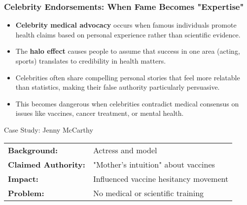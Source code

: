 \documentclass{beamer}
\begin{document}
	\begin{frame}
		\frametitle{Celebrity Endorsements: When Fame Becomes "Expertise"}
		\begin{itemize}
			\item \textbf{Celebrity medical advocacy} occurs when famous individuals promote health claims based on personal experience rather than scientific evidence.
			\item The \textbf{halo effect} causes people to assume that success in one area (acting, sports) translates to credibility in health matters.
			\item Celebrities often share compelling personal stories that feel more relatable than statistics, making their false authority particularly persuasive.
			\item This becomes dangerous when celebrities contradict medical consensus on issues like vaccines, cancer treatment, or mental health.
		\end{itemize}
		
		\begin{block}{Case Study: Jenny McCarthy}
			\scriptsize
			\begin{tabular}{p{4cm}p{6cm}}
				\textbf{Background:} & Actress and model \\
				\textbf{Claimed Authority:} & "Mother's intuition" about vaccines \\
				\textbf{Impact:} & Influenced vaccine hesitancy movement \\
				\textbf{Problem:} & No medical or scientific training
			\end{tabular}
		\end{block}
	\end{frame}
	
\end{document}
